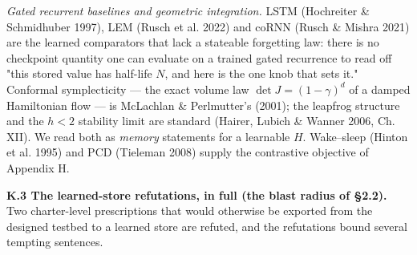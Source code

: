 \documentclass{article}
\begin{document}
\emph{Gated recurrent baselines and geometric integration.} LSTM (Hochreiter \& Schmidhuber 1997), LEM (Rusch et al. 2022) and coRNN (Rusch \& Mishra 2021) are the learned comparators that lack a stateable forgetting law: there is no checkpoint quantity one can evaluate on a trained gated recurrence to read off "this stored value has half-life $N$, and here is the one knob that sets it." Conformal symplecticity --- the exact volume law $\det J=(1-\gamma)^d$ of a damped Hamiltonian flow --- is McLachlan \& Perlmutter's (2001); the leapfrog structure and the $h<2$ stability limit are standard (Hairer, Lubich \& Wanner 2006, Ch. XII). We read both as \emph{memory} statements for a learnable $H$. Wake--sleep (Hinton et al. 1995) and PCD (Tieleman 2008) supply the contrastive objective of Appendix H.

\textbf{K.3 The learned-store refutations, in full (the blast radius of \S 2.2).} Two charter-level prescriptions that would otherwise be exported from the designed testbed to a learned store are refuted, and the refutations bound several tempting sentences.
\end{document}
